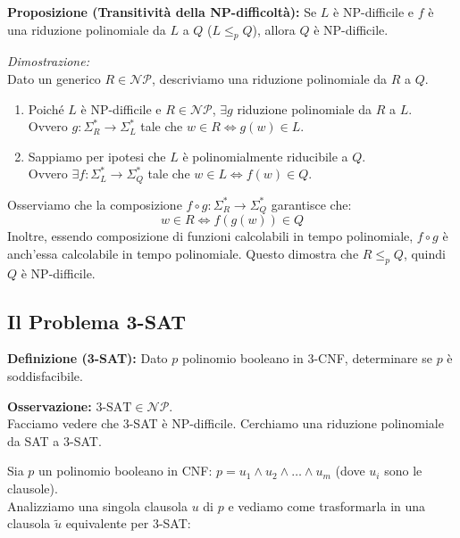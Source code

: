 \vspace{0.8cm}

\textbf{Proposizione (Transitività della NP-difficoltà):} 
Se $L$ è NP-difficile e $f$ è una riduzione polinomiale da $L$ a $Q$ ($L \le_p Q$), allora $Q$ è NP-difficile.

\vspace{0.2cm}
\textit{Dimostrazione:} \\
Dato un generico $R \in \mathcal{NP}$, descriviamo una riduzione polinomiale da $R$ a $Q$.
\begin{enumerate}
    \item Poiché $L$ è NP-difficile e $R \in \mathcal{NP}$, $\exists g$ riduzione polinomiale da $R$ a $L$. \\
    Ovvero $g: \Sigma_R^* \to \Sigma_L^*$ tale che $w \in R \iff g(w) \in L$.
    \item Sappiamo per ipotesi che $L$ è polinomialmente riducibile a $Q$. \\
    Ovvero $\exists f: \Sigma_L^* \to \Sigma_Q^*$ tale che $w \in L \iff f(w) \in Q$.
\end{enumerate}

Osserviamo che la composizione $f \circ g : \Sigma_R^* \to \Sigma_Q^*$ garantisce che:
$$ w \in R \iff f(g(w)) \in Q $$
Inoltre, essendo composizione di funzioni calcolabili in tempo polinomiale, $f \circ g$ è anch'essa calcolabile in tempo polinomiale. Questo dimostra che $R \le_p Q$, quindi $Q$ è NP-difficile.


\vspace{0.8cm}

\subsection{Il Problema 3-SAT}

\textbf{Definizione (3-SAT):} Dato $p$ polinomio booleano in 3-CNF, determinare se $p$ è soddisfacibile.
\begin{center}
\end{center}

\vspace{0.4cm}
\textbf{Osservazione:} $\text{3-SAT} \in \mathcal{NP}$. \\
Facciamo vedere che 3-SAT è NP-difficile. Cerchiamo una riduzione polinomiale da SAT a 3-SAT.

Sia $p$ un polinomio booleano in CNF: 
$p = u_1 \land u_2 \land \dots \land u_m$ (dove $u_i$ sono le clausole). \\
Analizziamo una singola clausola $u$ di $p$ e vediamo come trasformarla in una clausola $\tilde{u}$ equivalente per 3-SAT:

